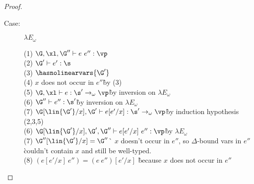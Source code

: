 \begin{proof}
\begin{description}
\item[Case:] $\lambda E_\omega$
\begin{tabbing}
  (1) $\G, \xl, \G'' \vdash e~e'' : \vp$\\
  (2) $\G' \vdash e' : \s$\\
  (3) $\hasnolinearvars{\G'}$\\
  (4) $x$ does not occur in $e''$\` by (3)\\
  (5) $\G, \xl \vdash e : \s' \to_\omega \vp$\` by inversion on $\lambda E_\omega$\\
  (6) $\G'' \vdash e'' : \s'$\` by inversion on $\lambda E_\omega$\\
  (7) $\G[\lin{\G'}/x], \G' \vdash e[e'/x] : \s' \to_\omega \vp$\` by induction hypothesis (2,3,5)\\
  (6) $\G[\lin{\G'}/x], \G', \G'' \vdash e[e'/x]~e'' : \vp$\` by $\lambda E_\omega$\\
  (7) $\G''[\lin{\G'}/x] = \G''$\` $x$ doesn't occur in $e''$, so $\Delta$-bound vars in $e''$ \\
      \` couldn't contain $x$ and still be well-typed.\\
  (8) $(e[e'/x]~e'') = (e~e'')[e'/x]$ \` because $x$ does not occur in $e''$\\
\end{tabbing}


\end{description}
\end{proof}
